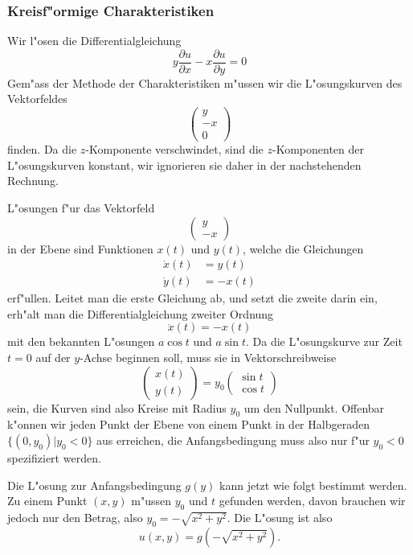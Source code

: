 \subsubsection{Kreisf"ormige Charakteristiken}
Wir l"osen die Differentialgleichung
\[
y\frac{\partial u}{\partial x}-x\frac{\partial u}{\partial y}=0
\]
Gem"ass der Methode der Charakteristiken m"ussen wir die L"osungskurven
des Vektorfeldes
\[
\begin{pmatrix}
y\\-x\\0
\end{pmatrix}
\]
finden. Da die $z$-Komponente verschwindet, sind die $z$-Komponenten
der L"osungskurven konstant, wir ignorieren sie daher in der nachstehenden
Rechnung.

L"osungen f"ur das Vektorfeld 
\[
\begin{pmatrix}
y\\-x
\end{pmatrix}
\]
in der Ebene sind Funktionen $x(t)$ und $y(t)$, welche die Gleichungen
\begin{align*}
\dot x(t)&=y(t)\\
\dot y(t)&=-x(t)
\end{align*}
erf"ullen. Leitet man die erste Gleichung ab, und setzt die zweite
darin ein, erh"alt man die Differentialgleichung zweiter Ordnung
\[
\ddot x(t)=-x(t)
\]
mit den bekannten L"osungen $a\cos t$ und $a \sin t$. Da die L"osungskurve
zur Zeit $t=0$ auf der $y$-Achse beginnen soll, muss sie in Vektorschreibweise
\[
\begin{pmatrix}
x(t)\\y(t)
\end{pmatrix}
=y_0\begin{pmatrix}
\sin t\\
\cos t
\end{pmatrix}
\]
sein, die Kurven sind also Kreise mit Radius $y_0$ um den Nullpunkt. Offenbar
k"onnen wir jeden Punkt der Ebene von einem Punkt in der Halbgeraden
$\{(0,y_0)|y_0 <0\}$ aus erreichen, die Anfangsbedingung muss also nur f"ur
$y_0<0$ spezifiziert werden.

Die L"osung zur Anfangsbedingung $g(y)$ kann jetzt wie folgt bestimmt werden.
Zu einem Punkt $(x,y)$ m"ussen $y_0$ und $t$ gefunden werden, davon brauchen wir
jedoch nur den Betrag, also $y_0=-\sqrt{x^2+y^2}$. Die L"osung ist also
\[
u(x,y)=g(-\sqrt{x^2+y^2}).
\]

